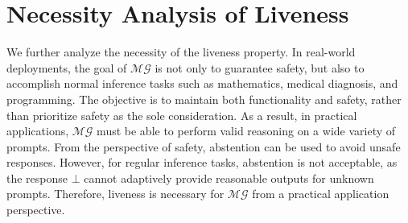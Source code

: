 \documentclass[11pt]{article}
\begin{document}
\section{Necessity Analysis of Liveness}
We further analyze the necessity of the liveness property. In real-world deployments, the goal of $\mathcal{MG}$ is not only to guarantee safety, but also to accomplish normal inference tasks such as mathematics, medical diagnosis, and programming. The objective is to maintain both functionality and safety, rather than prioritize safety as the sole consideration. As a result, in practical applications, $\mathcal{MG}$ must be able to perform valid reasoning on a wide variety of prompts. From the perspective of safety, abstention can be used to avoid unsafe responses. However, for regular inference tasks, abstention is not acceptable, as the response $\bot$ cannot adaptively provide reasonable outputs for unknown prompts. Therefore, liveness is necessary for $\mathcal{MG}$ from a practical application perspective. 
\end{document}
